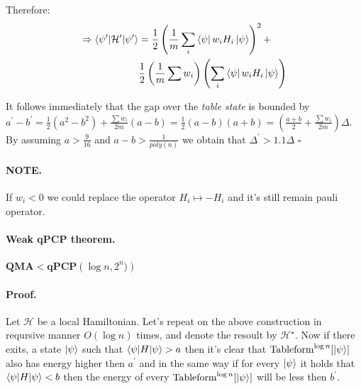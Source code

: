 \documentclass{article}
\newcommand{\PSI}{{\ket{\psi}}}
\begin{document}
\begin{multicols*}{2}
Therefore:
\begin{equation*}
\begin{split}
    \Rightarrow \braket{\psi^\prime| \mathcal{H}^\prime | \psi^\prime } &= \frac{1}{2}\left(    \frac{1}{m}\sum_{i}\bra{\psi}w_{i}H_{i}\ket{\psi} \right)^2 + \\ & \frac{1}{2}\left( \frac{1}{m}\sum{w_{i}}  \right)\left( \sum_{i}\bra{\psi}w_{i}H_{i}\ket{\psi} \right)  
\end{split}    
\end{equation*}

It follows immediately that the gap over the \textit{table state} is bounded by \( a^\prime - b^\prime = \frac{1}{2}\left( a^2 - b^2  \right) + \frac{\sum{w_i}}{2m}\left(a-b\right) = \frac{1}{2} \left( a-b\right)\left(a + b\right)  = \left(\frac{a + b}{2} + \frac{\sum{w_i}}{2m}  \right)\Delta \). By assuming \(a > \frac{9}{16}\) and \(a -b > \frac{1}{poly(n)} \) we obtain that \( \Delta^{\prime} > 1.1\Delta \) \( \square\) 

\paragraph{NOTE.} If \(w_i < 0 \) we could replace the operator \(H_{i} \mapsto -H_{i}\) and it's still remain pauli operator.


\paragraph{Weak qPCP theorem.} \textit{ \(\textbf{QMA} < \textbf{qPCP}\left( \log n , 2^n)\right) \)} 
\paragraph{Proof.} Let \(\mathcal{H}\) be a local Hamiltonian. Let's repeat on the above construction in reqursive manner \( O(\log n) \) times, and denote the resoult by \(\mathcal{H}^{\star}\). Now if there exits, a state \( \PSI \) such that \( \braket{\psi|H|\psi} > a \) then it's clear that \( \text{Tableform}^{\log n}[\PSI] \) also has energy higher then \(a^{\prime}\) and in the same way if for every \(\PSI\) it holds that \( \braket{\psi|H|\psi} < b \) then the energy of every  \( \text{Tableform}^{\log n}[\PSI] \) will be less then \(b^{\prime}\). 


\end{multicols*}
\end{document}
